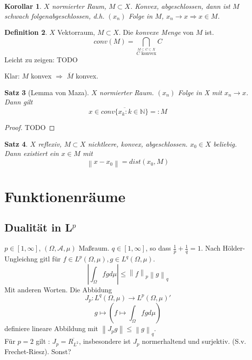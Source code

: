 \documentclass[ngerman]{report}
\theoremstyle{plain}%
\newtheorem{thm}{Satz}[chapter]
\newtheorem{cor}[thm]{Korollar}
\theoremstyle{definition}%
\newtheorem{definition}[thm]{Definition}
\theoremstyle{myStyle}
\newcommand{\N}{\mathbb{N}}
\newcommand{\norm}[1]{\left \|#1\right\| }
\newcommand{\df}[1][]{%
	\overset{#1}{\Rightarrow}
}
\newcommand{\ov}[1]{\overline{#1}}
\newcommand{\set}[1]{\{#1\}} %
\newcommand{\wkc}{\longrightarrow} %
\begin{document}
	\begin{cor}
		$X$ normierter Raum, $M\subset X$. Konvex, abgeschlossen, dann ist $M$ schwach folgenabgeschlossen, d.h. $(x_n)$ Folge in $M$, $x_n \wkc x \df x \in M$.
	\end{cor}

	\begin{definition}
		$X$ Vektorraum, $M \subset X$. Die \textit{konvexe Menge} von $M$ ist. 
			$$conv(M) = \bigcap_{\overset{M \subset C \subset X}{C \text{ konvex}}} C$$ 
			Leicht zu zeigen: TODO 
	\end{definition}

	Klar: $M$ konvex $\df$ $\ov{M}$ konvex.

	\begin{thm}[Lemma von Maza]
		$X$ normierter Raum. $(x_n)$ Folge in X mit $x_n \wkc x$. Dann gilt 
				$$ x\in \ov{conv\set{x_k: k\in\N}} =: M$$
	\end{thm}

	\begin{proof}
		TODO
	\end{proof}

	\begin{thm}
		$X$ reflexiv, $M\subset X$ nichtleere, konvex, abgeschlossen. $x_0 \in X$ beliebig. Dann existiert ein $x\in M$ mit  
		$$ \norm{x - x_0} = dist(x_0,M)$$
	\end{thm}

	\chapter{Funktionenräume}

	\section{Dualität in L$^p$}

	$p\in [1,\infty]$, $(\Omega, \mathcal{A}, \mu)$ Maßraum. $q\in [1,\infty]$, so dass $\frac{1}{p} + \frac{1}{q} = 1$. Nach Hölder-Ungleichng gitl für $f\in L^p(\Omega,\mu), g\in L^q(\Omega, \mu)$.\\
	$$\left| \int_\Omega fg d\mu \right| \leq \norm{f}_p \norm{g}_q$$
	Mit anderen Worten. Die Abbidung
		$$ J_p : L^q(\Omega,\mu) \to L^p(\Omega, \mu)' $$
		$$ g \mapsto (f \mapsto \int_\Omega fg d\mu)$$
	definiere lineare Abbildung mit $\norm{J_pg} \leq \norm{g}_q$.\\
	Für $p=2$ gilt : $J_p = \ov{R_{L^2}}$, insbesondere ist $J_p$ normerhaltend und surjektiv. (S.v. Frechet-Riesz). Sonst?
\end{document}
